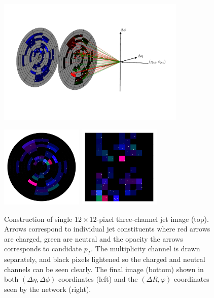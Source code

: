 \begin{figure}[h!]
    \includegraphics[width=0.8\textwidth]{figures/event_selection/jet_diagram_RGB.pdf}
    \begin{center}
        \includegraphics[width=0.35\textwidth]{figures/event_selection/full_image_polar.pdf}
        \includegraphics[width=0.35\textwidth]{figures/event_selection/full_image_rect.pdf}
    \end{center}
    \caption{Construction of single $12\times{}12$-pixel three-channel jet image (top). 
             Arrows correspond to individual jet constituents where red arrows are charged, green are neutral and the opacity the arrows corresponds to candidate $p_{T}$.
             The multiplicity channel is drawn separately, and black pixels lightened so the charged and neutral channels can be seen clearly.
             The final image (bottom) shown in both $(\Delta\eta,\Delta\phi)$ coordinates (left) and the $(\Delta{R},\varphi)$ coordinates seen by the network (right).}
    \label{fig:event_categorisation:jet_image}
\end{figure}

